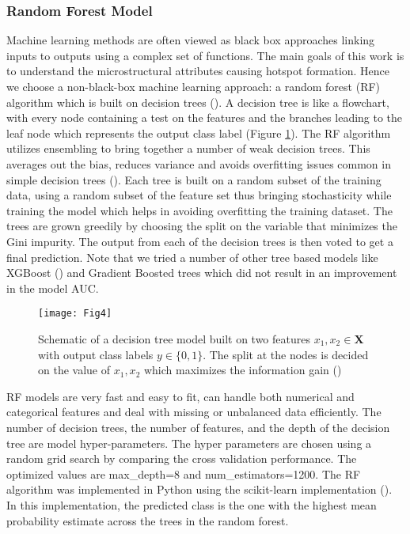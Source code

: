 \documentclass[preprint,1p,times,authoryear]{elsarticle}%
\begin{document}
\subsubsection{Random Forest Model} 
Machine learning methods are often viewed as black box approaches linking inputs to outputs using a complex set of functions. The main goals of this work is to understand the microstructural attributes causing hotspot formation. Hence we choose a non-black-box machine learning approach: a random forest (RF) algorithm which is built  on decision trees (\cite{Breiman2001}). A decision tree is like a flowchart, with every node containing a test on the features and the branches leading to the leaf node which represents the output class label (Figure \ref{fig:DecisionTree}). The RF algorithm utilizes ensembling to bring together a number of weak decision trees. This averages out the bias, reduces variance and avoids overfitting issues common in simple decision trees (\cite{dietterich2000ensemble}). Each tree is built on a random subset of the training data, using a random subset of the feature set thus bringing stochasticity while training the model which helps in avoiding overfitting the training dataset. The trees are grown greedily by choosing the split on the variable that minimizes the Gini impurity. The output from each of the decision trees is then voted to get a final prediction. Note that we tried a number of other tree based models like XGBoost (\cite{Chen:2016:XST:2939672.2939785}) and Gradient Boosted trees which did not result in an improvement in the model AUC. 

\begin{figure}[!htb]
\centering
	\texttt{[image: Fig4]}%
	\caption{Schematic of a decision tree model built on two features $x_1, x_2 \in \mathbf{X}$ with output class labels $y\in \{0,1\}$. The split at the nodes is decided on the value of $x_1, x_2$ which maximizes the information gain (\cite{Quinlan1986, quinlan2014c4}) }
	\label{fig:DecisionTree}
\end{figure}

RF models are very fast and easy to fit, can handle both numerical and categorical features and deal with missing or unbalanced data efficiently. The number of decision trees, the number of features, and the depth of the decision tree are model hyper-parameters. The hyper parameters are chosen using a random grid search by comparing the cross validation performance. The optimized values are max\_depth=8 and num\_estimators=1200. The RF algorithm was implemented in Python using the scikit-learn implementation (\cite{pedregosa2011scikit}). In this implementation, the predicted class is the one with the highest mean probability estimate across the trees in the random forest. 
\end{document}
